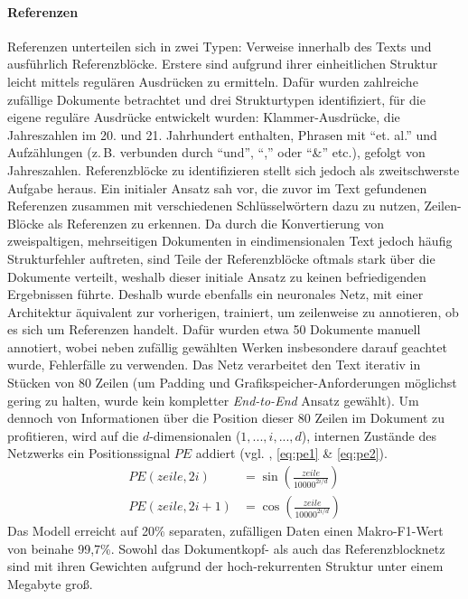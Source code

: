 \documentclass[bachelor,german]{info1thesis}
\begin{document}
\paragraph{Referenzen} Referenzen unterteilen sich in zwei Typen: Verweise innerhalb des Texts und ausführlich Referenzblöcke. Erstere sind aufgrund ihrer einheitlichen Struktur leicht mittels regulären Ausdrücken zu ermitteln. Dafür wurden zahlreiche zufällige Dokumente betrachtet und drei Strukturtypen identifiziert, für die eigene reguläre Ausdrücke entwickelt wurden: Klammer-Ausdrücke, die Jahreszahlen im 20. und 21. Jahrhundert enthalten, Phrasen mit ``et. al.'' und Aufzählungen (z.\,B. verbunden durch ``und'', ``,'' oder ``\&'' etc.), gefolgt von Jahreszahlen. Referenzblöcke zu identifizieren stellt sich jedoch als zweitschwerste Aufgabe heraus. Ein initialer Ansatz sah vor, die zuvor im Text gefundenen Referenzen zusammen mit verschiedenen Schlüsselwörtern dazu zu nutzen, Zeilen-Blöcke als Referenzen zu erkennen. Da durch die Konvertierung von zweispaltigen, mehrseitigen Dokumenten in eindimensionalen Text jedoch häufig Strukturfehler auftreten, sind Teile der Referenzblöcke oftmals stark über die Dokumente verteilt, weshalb dieser initiale Ansatz zu keinen befriedigenden Ergebnissen führte. Deshalb wurde ebenfalls ein neuronales Netz, mit einer Architektur äquivalent zur vorherigen, trainiert, um zeilenweise zu annotieren, ob es sich um Referenzen handelt. Dafür wurden etwa 50 Dokumente manuell annotiert, wobei neben zufällig gewählten Werken insbesondere darauf geachtet wurde, Fehlerfälle zu verwenden. Das Netz verarbeitet den Text iterativ in Stücken von 80 Zeilen (um Padding und Grafikspeicher-Anforderungen möglichst gering zu halten, wurde kein kompletter \textit{End-to-End} Ansatz gewählt). Um dennoch von Informationen über die Position dieser 80 Zeilen im Dokument zu profitieren, wird auf die $d$-dimensionalen ($1, ..., i, ..., d$), internen Zustände des Netzwerks ein Positionssignal $PE$ addiert (vgl. \cite{Vaswani2017}, \autoref{eq:pe1} \& \ref{eq:pe2}).
\begin{align}
PE(zeile, 2i) &= \sin\left(\frac{zeile}{10000^{2i / d}}\right) \label{eq:pe1} \\ \label{eq:pe2}
PE(zeile, 2i+1) &= \cos\left(\frac{zeile}{10000^{2i / d}}\right)
\end{align}
Das Modell erreicht auf 20\% separaten, zufälligen Daten einen Makro-F1-Wert von beinahe 99,7\%.
Sowohl das Dokumentkopf- als auch das Referenzblocknetz sind mit ihren Gewichten aufgrund der hoch-rekurrenten Struktur unter einem Megabyte groß.
\end{document}
